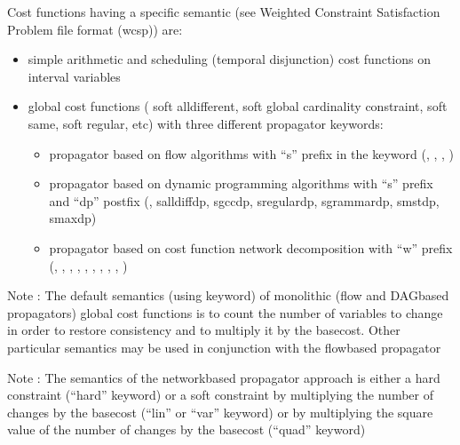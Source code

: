 \documentclass[letterpaper,10pt,openany,oneside,english]{sphinxmanual}
\begin{document}
\begin{fulllineitems}
\begin{itemize}
\end{itemize}

Cost functions having a specific semantic (see Weighted Constraint Satisfaction Problem file format (wcsp)) are:\begin{itemize}
\item {} 
\sphinxAtStartPar
simple arithmetic and scheduling (temporal disjunction) cost functions on interval variables

\item {} 
\sphinxAtStartPar
global cost functions ( soft alldifferent, soft global cardinality constraint, soft same, soft regular, etc) with three different propagator keywords:\begin{itemize}
\item {} 
\sphinxAtStartPar
{} propagator based on flow algorithms with “s” prefix in the keyword (, , , )

\item {} 
\sphinxAtStartPar
{} propagator based on dynamic programming algorithms with “s” prefix and “dp” postfix (, salldiffdp, sgccdp, sregulardp, sgrammardp, smstdp, smaxdp)

\item {} 
\sphinxAtStartPar
{} propagator based on cost function network decomposition with “w” prefix (, , , , , , , , , )

\end{itemize}


\end{itemize}

Note : The default semantics (using  keyword) of monolithic (flow and DAG\sphinxhyphen{}based propagators) global cost functions is to count the number of variables to change in order to restore consistency and to multiply it by the basecost. Other particular semantics may be used in conjunction with the flow\sphinxhyphen{}based propagator

\sphinxAtStartPar
Note : The semantics of the network\sphinxhyphen{}based propagator approach is either a hard constraint (“hard” keyword) or a soft constraint by multiplying the number of changes by the basecost (“lin” or “var” keyword) or by multiplying the square value of the number of changes by the basecost (“quad” keyword)


\end{fulllineitems}
\end{document}
